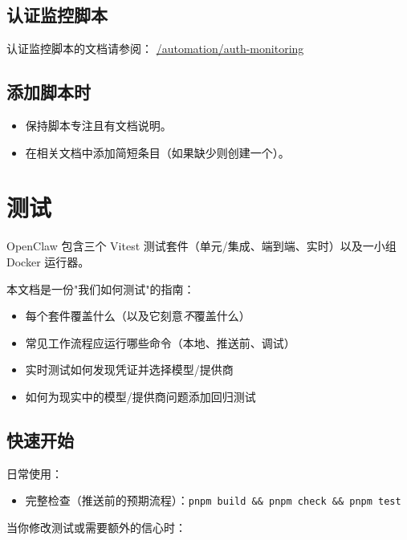 \subsection{认证监控脚本}


认证监控脚本的文档请参阅：
\href{/automation/auth-monitoring}{/automation/auth-monitoring}

\subsection{添加脚本时}


\begin{itemize}
  \item 保持脚本专注且有文档说明。
  \item 在相关文档中添加简短条目（如果缺少则创建一个）。
\end{itemize}



\clearpage

\section{测试}


OpenClaw 包含三个 Vitest 测试套件（单元/集成、端到端、实时）以及一小组 Docker 运行器。

本文档是一份"我们如何测试"的指南：

\begin{itemize}
  \item 每个套件覆盖什么（以及它刻意\textit{不}覆盖什么）
  \item 常见工作流程应运行哪些命令（本地、推送前、调试）
  \item 实时测试如何发现凭证并选择模型/提供商
  \item 如何为现实中的模型/提供商问题添加回归测试
\end{itemize}


\subsection{快速开始}


日常使用：

\begin{itemize}
  \item 完整检查（推送前的预期流程）：\texttt{pnpm build \&\& pnpm check \&\& pnpm test}
\end{itemize}


当你修改测试或需要额外的信心时：


